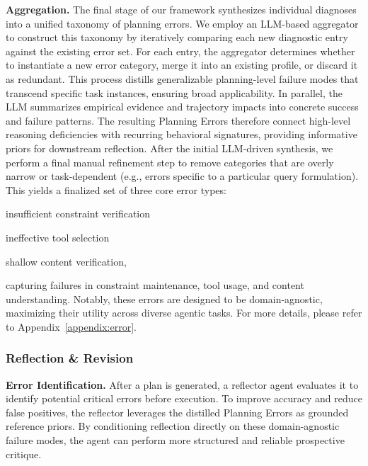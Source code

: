 \noindent\textbf{Aggregation.} The final stage of our framework synthesizes individual diagnoses into a unified taxonomy of planning errors. We employ an LLM-based aggregator to construct this taxonomy by iteratively comparing each new diagnostic entry against the existing error set. For each entry, the aggregator determines whether to instantiate a new error category, merge it into an existing profile, or discard it as redundant. This process distills generalizable planning-level failure modes that transcend specific task instances, ensuring broad applicability. In parallel, the LLM summarizes empirical evidence and trajectory impacts into concrete success and failure patterns. The resulting Planning Errors therefore connect high-level reasoning deficiencies with recurring behavioral signatures, providing informative priors for downstream reflection. After the initial LLM-driven synthesis, we perform a final manual refinement step to remove categories that are overly narrow or task-dependent (e.g., errors specific to a particular query formulation). This yields a finalized set of three core error types:
\begin{enumerate*}[label=\arabic*)]
    \item insufficient constraint verification
    \item ineffective tool selection
    \item shallow content verification,
\end{enumerate*}
capturing failures in constraint maintenance, tool usage, and content understanding. Notably, these errors are designed to be domain-agnostic, maximizing their utility across diverse agentic tasks. For more details, please refer to Appendix~\ref{appendix:error}.


\subsubsection{Reflection \& Revision}
\label{subsubsec:ref_rev}
\noindent\textbf{Error Identification.} After a plan is generated, a reflector agent evaluates it to identify potential critical errors before execution. To improve accuracy and reduce false positives, the reflector leverages the distilled Planning Errors as grounded reference priors. By conditioning reflection directly on these domain-agnostic failure modes, the agent can perform more structured and reliable prospective critique.





